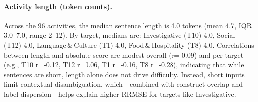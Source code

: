 \paragraph*{Activity length (token counts).} Across the 96 activities, the median sentence length is 4.0 tokens (mean 4.7, IQR 3.0–7.0, range 2–12). By target, medians are: Investigative (T10) 4.0, Social (T12) 4.0, Language\,\&\,Culture (T1) 4.0, Food\,\&\,Hospitality (T8) 4.0. Correlations between length and absolute score are modest overall (r=-0.09) and per target (e.g., T10 r=-0.12, T12 r=0.06, T1 r=-0.16, T8 r=-0.28), indicating that while sentences are short, length alone does not drive difficulty. Instead, short inputs limit contextual disambiguation, which—combined with construct overlap and label dispersion—helps explain higher RRMSE for targets like Investigative.